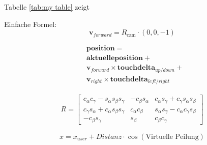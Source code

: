 Tabelle \ref{tab:my table} zeigt

Einfache Formel:
\begin{equation}
    \mathbf{v}_{forward} = R_{\text{cam}} \cdot (0, 0, -1)
\end{equation}

\begin{equation}
    \begin{aligned}
    & \mathbf{position} = \\
    &    \mathbf{aktuelle position} + \\
    &    \mathbf{v}_{forward} \times \mathbf{touch delta}_{up/down} + \\
    &    \mathbf{v}_{right} \times \mathbf{touch delta}_{left/right}
    \end{aligned}
\end{equation}

\begin{align*}
    R = \begin{bmatrix} 
        c_\alpha c_\gamma - s_\alpha s_\beta s_\gamma & -c_\beta s_\alpha & c_\alpha s_\gamma + c_\gamma s_\alpha s_\beta \\
        c_\gamma s_\alpha + c_\alpha s_\beta s_\gamma & c_\alpha c_\beta & s_\alpha s_\gamma - c_\alpha c_\gamma s_\beta \\
        -c_\beta s_\gamma & s_\beta & c_\beta c_\gamma
    \end{bmatrix}
\end{align*}

\[
x = x_{user} + \textit{Distanz} \cdot \cos(\text{Virtuelle Peilung})
\]
